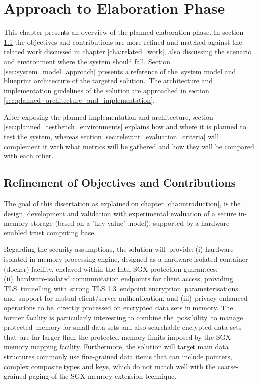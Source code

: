 
\chapter{Approach to Elaboration Phase}
\label{cha:approach_to_elaboration_phase}

This chapter presents an overview of the planned elaboration phase. 
In section \ref{sec:refinement_of_objectives_and_contributions} the objectives and contributions are more refined and matched against the related work discussed in chapter \ref{cha:related_work}, also discussing the scenario and environment where the system should fall.
Section \ref{sec:system_model_approach} presents a reference of the system model and blueprint architecture of the targeted solution. The architecture and implementation guidelines of the solution are approached in section \ref{sec:planned_architecture_and_implementation}.

After exposing the planned implementation and architecture, section \ref{sec:planned_testbench_environments} explains how and where it is planned to test the system, whereas section \ref{sec:relevant_evaluation_criteria} will complement it with what metrics will be gathered and how they will be compared with each other.

\section{Refinement of Objectives and Contributions} %
\label{sec:refinement_of_objectives_and_contributions}

The goal of this dissertation as explained on chapter \ref{cha:introduction}, is the design, development and validation with experimental evaluation of a secure in-memory storage (based on a "key-value" model), supported by a hardware-enabled trust computing base.

Regarding the security assumptions, the solution will provide: (i) hardware-isolated in-memory processing engine, designed as a hardware-isolated container (docker) facility, enclaved within the Intel-SGX protection guarantees; (ii) hardware-isolated communication endpoints for client access, providing TLS tunnelling with strong TLS 1.3 endpoint encryption parameterisations and support for mutual client/server authentication, and (iii) privacy-enhanced operations to be directly processed on encrypted data sets in memory. The former facility is particularly interesting to combine the possibility to manage protected memory for small data sets and also searchable encrypted data sets that are far larger than the protected memory limits imposed by the SGX memory mapping facility. Furthermore, the solution will target main data structures commonly use fine-grained data items that can include pointers, complex composite types and keys, which do not match well with the coarse-grained paging of the SGX memory extension technique.


